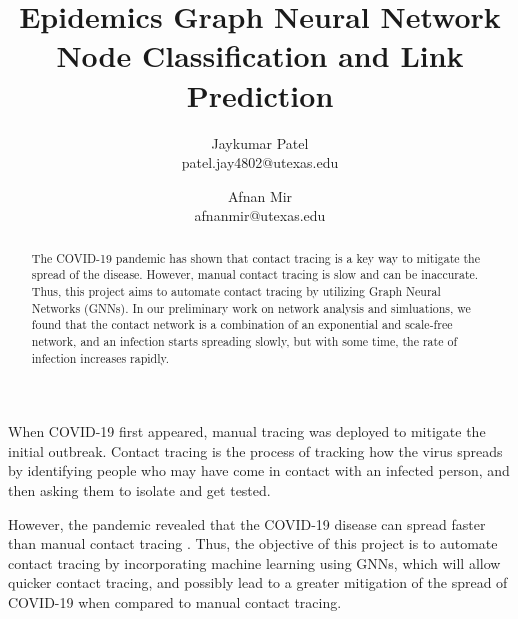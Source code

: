 \documentclass[times, 10pt,twocolumn]{article}
\begin{document}
\title{Epidemics Graph Neural Network Node Classification and Link Prediction}

\author{Jaykumar Patel\\
patel.jay4802@utexas.edu\\
\and
Afnan Mir\\
afnanmir@utexas.edu\\
}

\maketitle
\thispagestyle{empty}

\begin{abstract}
The COVID-19 pandemic has shown that contact tracing is a key way to mitigate the spread of the disease. However, manual contact tracing is slow and can be inaccurate. Thus, this project aims to automate contact tracing by utilizing Graph Neural Networks (GNNs). In our preliminary work on network analysis and simluations, we found that the contact network is a combination of an exponential and scale-free network, and an infection starts spreading slowly, but with some time, the rate of infection increases rapidly. 
\end{abstract}



When COVID-19 first appeared, manual tracing was deployed to mitigate the initial outbreak. Contact tracing is the process of tracking how the virus spreads by identifying people who may have come in contact with an infected person, and then asking them to isolate and get tested.

However, the pandemic revealed that the COVID-19 disease can spread faster than manual contact tracing \cite{flaxman2020estimating}. Thus, the objective of this project is to automate contact tracing by incorporating machine learning using GNNs, which will allow quicker contact tracing, and possibly lead to a greater mitigation of the spread of COVID-19 when compared to manual contact tracing.

\end{document}
